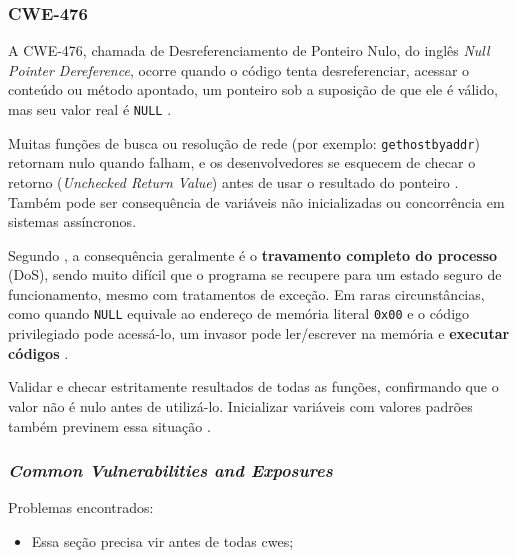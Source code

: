 \documentclass[
    12pt,                %
    openright,           %
    oneside,             %
    a4paper,             %
    english,             %
    brazil               %
]{abntex2}
\begin{document}
\begin{itemize}
\subsubsection{CWE-476}
\label{sec:476}
\par
A CWE-476, chamada de Desreferenciamento de Ponteiro Nulo, do inglês \textit{Null Pointer Dereference}, ocorre quando o código tenta desreferenciar, acessar o conteúdo ou método apontado, um ponteiro sob a suposição de que ele é válido, mas seu valor real é \texttt{NULL} \cite{cwe476}.
\par
Muitas funções de busca ou resolução de rede (por exemplo: \texttt{gethostbyaddr}) retornam nulo quando falham, e os desenvolvedores se esquecem de checar o retorno (\textit{Unchecked Return Value}) antes de usar o resultado do ponteiro \cite{cwe476}.
Também pode ser consequência de variáveis não inicializadas ou concorrência em sistemas assíncronos.
\par
Segundo , a consequência geralmente é o \textbf{travamento completo do processo} (DoS), sendo muito difícil que o programa se recupere para um estado seguro de funcionamento, mesmo com tratamentos de exceção.
Em raras circunstâncias, como quando \texttt{NULL} equivale ao endereço de memória literal \texttt{0x00} e o código privilegiado pode acessá-lo, um invasor pode ler/escrever na memória e \textbf{executar códigos} \cite{cwe476}.
\par
Validar e checar estritamente resultados de todas as funções, confirmando que o valor não é nulo antes de utilizá-lo. Inicializar variáveis com valores padrões também previnem essa situação \cite{cwe476}.

\subsubsection{\textit{Common Vulnerabilities and Exposures}}
\label{sec:cves}

\par
Problemas encontrados:

\begin{itemize}
  \item Essa seção precisa vir antes de todas cwes;
\end{itemize}


\end{itemize}
\end{document}
